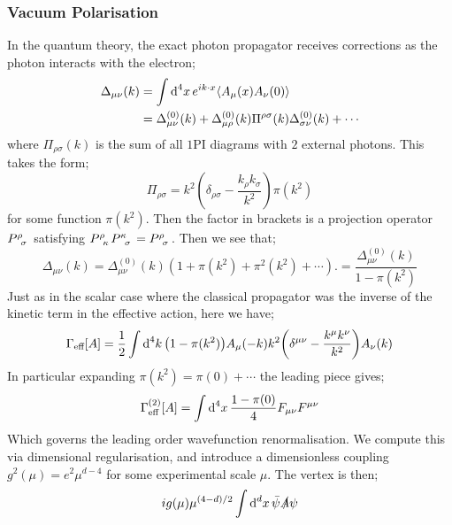 \subsubsection{Vacuum Polarisation}
In the quantum theory, the exact photon propagator receives corrections as the photon interacts with the electron;
\begin{align*}
\Delta_{\mu\nu}(k) &= \int{\upd{^4 x}e^{ik\cdot x}\left< A_{\mu}(x)A_{\nu}(0) \right>} \\
&= \Delta_{\mu\nu}^{(0)}(k) + \Delta^{(0)}_{\mu \rho}(k)\Pi^{\rho\sigma}(k)\Delta^{(0)}_{\sigma \nu}(k) + \cdots
\end{align*}
where $\Pi_{\rho \sigma}(k)$ is the sum of all $1$PI diagrams with $2$ external photons. This takes the form;
\begin{equation*}
\Pi_{\rho \sigma} = k^2\left(\delta_{\rho \sigma} - \frac{k_\rho k_\sigma}{k^2}\right)\pi(k^2)
\end{equation*}
for some function $\pi(k^2)$. Then the factor in brackets is a projection operator $P\indices{^{\rho}_{\sigma}}$ satisfying $P\indices{^{\rho}_{\kappa}}P\indices{^{\kappa}_{\sigma}} = P\indices{^{\rho}_{\sigma}}$. Then we see that;
\begin{equation*}
\Delta_{\mu\nu}(k) = \Delta_{\mu\nu}^{(0)}(k)\left(1 + \pi(k^2) + \pi^2(k^2) + \cdots\right). = \frac{\Delta_{\mu\nu}^{(0)}(k)}{1 - \pi(k^2)}
\end{equation*}
Just as in the scalar case where the classical propagator was the inverse of the kinetic term in the effective action, here we have;
\begin{equation*}
\Gamma_{\text{eff}}[A] = \frac{1}{2}\int{\upd{^4 k} \left(1 - \pi(k^2)\right)A_\mu(-k)k^2 \left(\delta^{\mu\nu} - \frac{k^{\mu}k^{\nu}}{k^2}\right)A_\nu(k)}
\end{equation*}
In particular expanding $\pi(k^2) = \pi(0) + \cdots$ the leading piece gives;
\begin{equation*}
\Gamma_{\text{eff}}^{(2)}[A] = \int{\text{d}^4 x \,\frac{1 - \pi(0)}{4}F_{\mu\nu}F^{\mu\nu}}
\end{equation*}
Which governs the leading order wavefunction renormalisation. We compute this via dimensional regularisation, and introduce a dimensionless coupling $g^2(\mu) = e^2 \mu^{d - 4}$ for some experimental scale $\mu$. The vertex is then;
\begin{equation*}
ig(\mu)\mu^{(4 - d)/2}\int{\text{d}^d x \,\bar{\psi}\slashed{A}\psi}
\end{equation*} 
